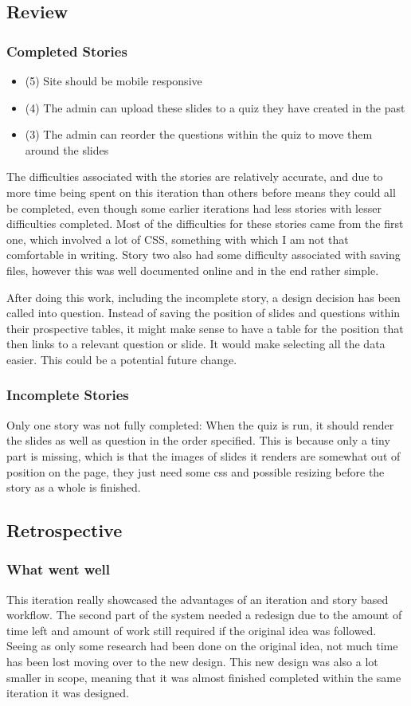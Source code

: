 \subsection{Review}
\subsubsection{Completed Stories}
\begin{itemize}
	\item (5) Site should be mobile responsive
	\item (4) The admin can upload these slides to a quiz they have created in the past
	\item (3) The admin can reorder the questions within the quiz to move them around the slides
\end{itemize}
The difficulties associated with the stories are relatively accurate, and due to more time being spent on this iteration than others before means they could all be completed, even though some earlier iterations had less stories with lesser difficulties completed. Most of the difficulties for these stories came from the first one, which involved a lot of CSS, something with which I am not that comfortable in writing. Story two also had some difficulty associated with saving files, however this was well documented online and in the end rather simple.

After doing this work, including the incomplete story, a design decision has been called into question. Instead of saving the position of slides and questions within their prospective tables, it might make sense to have a table for the position that then links to a relevant question or slide. It would make selecting all the data easier. This could be a potential future change.
\subsubsection{Incomplete Stories}
Only one story was not fully completed: When the quiz is run, it should render the slides as well as question in the order specified. This is because only a tiny part is missing, which is that the images of slides it renders are somewhat out of position on the page, they just need some css and possible resizing before the story as a whole is finished.

\subsection{Retrospective}
\subsubsection{What went well}
This iteration really showcased the advantages of an iteration and story based workflow. The second part of the system needed a redesign due to the amount of time left and amount of work still required if the original idea was followed. Seeing as only some research had been done on the original idea, not much time has been lost moving over to the new design. This new design was also a lot smaller in scope, meaning that it was almost finished completed within the same iteration it was designed.

